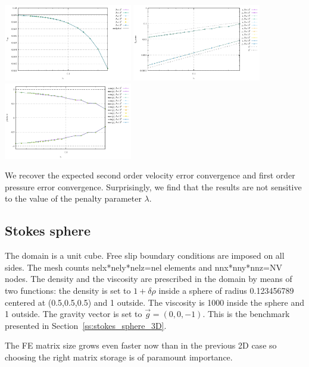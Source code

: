 \begin{center}
\includegraphics[width=5.6cm]{python_codes/fieldstone_10/results/exp5/vrms}
\includegraphics[width=5.6cm]{python_codes/fieldstone_10/results/exp5/conv}
\includegraphics[width=5.6cm]{python_codes/fieldstone_10/results/exp5/p_stats}
\end{center}
We recover the expected second order velocity error convergence 
and first order pressure error convergence. 
Surprisingly, we find that the results are not sensitive to the value of the penalty parameter $\lambda$.



\subsection*{Stokes sphere}

The domain is a unit cube. Free slip boundary conditions 
are imposed on all sides. The mesh counts 
nelx*nely*nelz=nel elements and 
nnx*nny*nnz=NV nodes.
The density and the viscosity are prescribed in the domain 
by means of two functions:
the density is set to $1+\delta \rho$ inside a sphere of radius 0.123456789 centered 
at (0.5,0.5,0.5) and 1 outside. The viscosity is 1000 inside the sphere
and 1 outside.  The gravity vector is set to $\vec{g}=(0,0,-1)$.
This is the benchmark presented in Section~\ref{ss:stokes_sphere_3D}.

The FE matrix size grows even faster now than in the previous 2D case so
choosing the right matrix storage is of paramount importance. 

